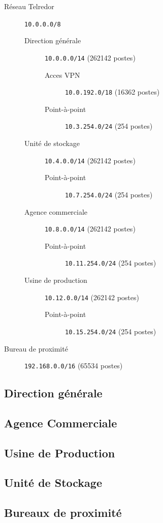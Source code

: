 \documentclass{article}
\newcommand{\tlr}{Telredor\xspace}
\begin{document}
\begin{description}
	\item[Réseau \tlr] \texttt{10.0.0.0/8}
	\begin{description}
		\item[Direction générale] \texttt{10.0.0.0/14} (262142 postes)
		\begin{description}
			\item[Acces VPN] \texttt{10.0.192.0/18} (16362 postes)
			\item[Point-à-point] \texttt{10.3.254.0/24} (254 postes)
		\end{description}
		\item[Unité de stockage] \texttt{10.4.0.0/14} (262142 postes)
		\begin{description}
			\item[Point-à-point] \texttt{10.7.254.0/24} (254 postes)
		\end{description}
		\item[Agence commerciale] \texttt{10.8.0.0/14} (262142 postes)
		\begin{description}
			\item[Point-à-point] \texttt{10.11.254.0/24} (254 postes)
		\end{description}
		\item[Usine de production] \texttt{10.12.0.0/14} (262142 postes)
		\begin{description}
			\item[Point-à-point] \texttt{10.15.254.0/24} (254 postes)
		\end{description}
	\end{description}
	\item[Bureau de proximité] \texttt{192.168.0.0/16} (65534 postes)
\end{description}

\subsection{Direction générale}



\subsection{Agence Commerciale}



\subsection{Usine de Production}



\subsection{Unité de Stockage}



\subsection{Bureaux de proximité}


\end{document}
